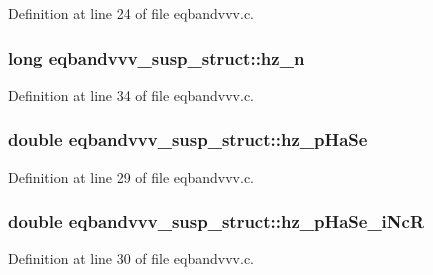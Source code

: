 Definition at line 24 of file eqbandvvv.\+c.

\subsubsection[{\texorpdfstring{hz\+\_\+n}{hz_n}}]{\setlength{\rightskip}{0pt plus 5cm}long eqbandvvv\+\_\+susp\+\_\+struct\+::hz\+\_\+n}\hypertarget{structeqbandvvv__susp__struct_ac4c42bcc708a99c76e38875d7a552d27}{}\label{structeqbandvvv__susp__struct_ac4c42bcc708a99c76e38875d7a552d27}


Definition at line 34 of file eqbandvvv.\+c.

\subsubsection[{\texorpdfstring{hz\+\_\+p\+Ha\+Se}{hz_pHaSe}}]{\setlength{\rightskip}{0pt plus 5cm}double eqbandvvv\+\_\+susp\+\_\+struct\+::hz\+\_\+p\+Ha\+Se}\hypertarget{structeqbandvvv__susp__struct_a44f5f246c5c3c887a6eb861c537b0806}{}\label{structeqbandvvv__susp__struct_a44f5f246c5c3c887a6eb861c537b0806}


Definition at line 29 of file eqbandvvv.\+c.

\subsubsection[{\texorpdfstring{hz\+\_\+p\+Ha\+Se\+\_\+i\+NcR}{hz_pHaSe_iNcR}}]{\setlength{\rightskip}{0pt plus 5cm}double eqbandvvv\+\_\+susp\+\_\+struct\+::hz\+\_\+p\+Ha\+Se\+\_\+i\+NcR}\hypertarget{structeqbandvvv__susp__struct_a63440b5901ad9c6a48ea2e20369e62ba}{}\label{structeqbandvvv__susp__struct_a63440b5901ad9c6a48ea2e20369e62ba}


Definition at line 30 of file eqbandvvv.\+c.


